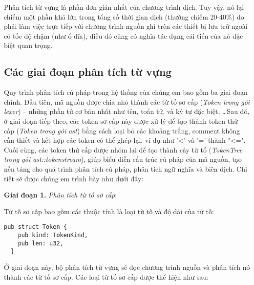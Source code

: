 Phân tích từ vựng là phần đơn giản nhất của chương trình dịch. Tuy vậy, nó lại chiếm một phần khá lớn trong tổng số thời gian dịch (thường chiếm 20-40\%) do phải làm việc trực tiếp với chương trình nguồn ghi trên các thiết bị lưu trữ ngoài có tốc độ chậm (như ổ đĩa), điều đó cũng có nghĩa tác dụng cải tiến của nó đặc biệt quan trọng.

\subsection{Các giai đoạn phân tích từ vựng}
Quy trình phân tích cú pháp trong hệ thống của chúng em bao gồm ba giai đoạn chính. Đầu tiên, mã nguồn được chia nhỏ thành các từ tố sơ cấp (\textit{Token trong gói lexer}) – những phần tử cơ bản nhất như tên, toán tử, và ký tự đặc biệt, \dots Sau đó, ở giai đoạn tiếp theo, các token sơ cấp này được xử lý để tạo thành token thứ cấp (\textit{Token trong gói ast}) bằng cách loại bỏ các khoảng trắng, comment không cần thiết và kết hợp các token có thể ghép lại, ví dụ như '<' và '=' thành "<=". Cuối cùng, các token thứ cấp được nhóm lại để tạo thành cây từ tố (\textit{TokenTree trong gói ast::tokenstream}), giúp biểu diễn cấu trúc cú pháp của mã nguồn, tạo nền tảng cho quá trình phân tích cú pháp, phân tích ngữ nghĩa và biên dịch. Chi tiết sẽ được chúng em trình bày như dưới đây:

\textbf{Giai đoạn 1.} \textit{Phân tích từ tố sơ cấp}:

Từ tố sơ cấp bao gồm các thuộc tính là loại từ tố và độ dài của từ tố:

\clearpage
\begin{lstlisting}[]
  pub struct Token {
    pub kind: TokenKind,
    pub len: u32,
  }
\end{lstlisting}

Ở giai đoạn này, bộ phân tích từ vựng sẽ đọc chương trình nguồn và phân tích nó thành các từ tố sơ cấp. Các loại từ tố sơ cấp được thể hiện như sau:


